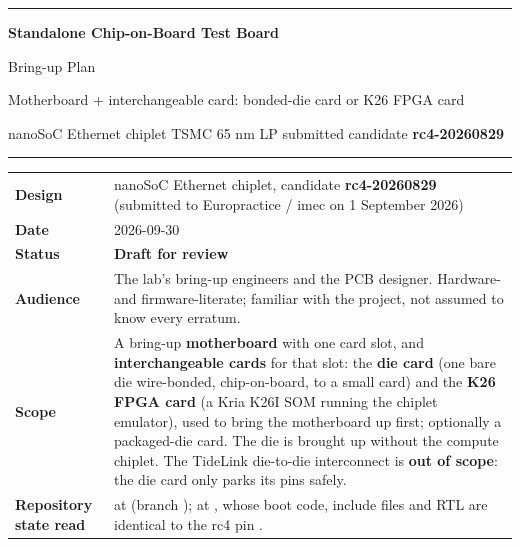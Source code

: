 \documentclass[10pt,a4paper]{article}
\newcommand\hd[1]{\textbf{#1}}
\renewcommand{\arraystretch}{1.18}
\begin{document}
\begin{titlepage}
\thispagestyle{empty}
\vspace*{1.6cm}
{\color{accent}\rule{\linewidth}{1.6pt}}\par
\vspace{0.7cm}
{\fontsize{26}{31}\selectfont\bfseries\color{accent} Standalone Chip-on-Board Test Board\par}
\vspace{0.25cm}
{\fontsize{19}{23}\selectfont Bring-up Plan\par}
\vspace{0.3cm}
{\large\color{accent2} Motherboard + interchangeable card: bonded-die card or K26 FPGA card\par}
\vspace{0.5cm}
{\large nanoSoC Ethernet chiplet \textperiodcentered{} TSMC 65 nm LP \textperiodcentered{} submitted candidate \textbf{rc4-20260829}\par}
\vspace{0.6cm}
{\color{accent}\rule{\linewidth}{0.6pt}}\par
\vspace{0.9cm}
{\renewcommand{\arraystretch}{1.45}
\begin{tabularx}{\linewidth}{@{}P{3.6cm}L@{}}
\hd{Design} & nanoSoC Ethernet chiplet, candidate \textbf{rc4-20260829} (submitted to Europractice / imec on 1 September 2026) \\
\hd{Date} & 2026-09-30 \\
\hd{Status} & \textbf{Draft for review} \\
\hd{Audience} & The lab's bring-up engineers and the PCB designer. Hardware- and firmware-literate; familiar with the project, not assumed to know every erratum. \\
\hd{Scope} & A bring-up \textbf{motherboard} with one card slot, and \textbf{interchangeable cards} for that slot: the \textbf{die card} (one bare die wire-bonded, chip-on-board, to a small card) and the \textbf{K26 FPGA card} (a Kria K26I SOM running the chiplet emulator), used to bring the motherboard up first; optionally a packaged-die card. The die is brought up without the compute chiplet. The TideLink die-to-die interconnect is \textbf{out of scope}: the die card only parks its pins safely. \\
\hd{Repository state read} &  at  (branch );  at , whose boot code, include files and RTL are identical to the rc4 pin . \\

\end{tabularx}}
\end{titlepage}
\end{document}
